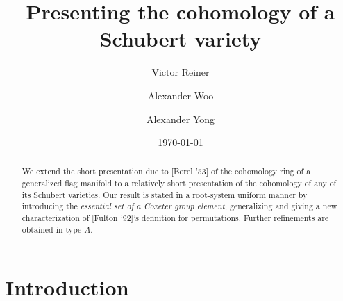 \documentclass[12pt,dvips]{amsart}
\theoremstyle{plain}
\theoremstyle{definition}
\theoremstyle{remark}
\numberwithin{equation}{section}
\begin{document}
\pagestyle{plain}
\title[Presenting Schubert variety cohomology]{Presenting the cohomology of a Schubert variety}

\author{Victor Reiner}
\address{School of Mathematics\\
University of  Minnesota\\
Minneapolis, MN 55455}

\author{Alexander Woo}
\address{Dept. of Mathematics, Statistics, and Computer Science\\
Saint Olaf College\\
Northfield, MN 55057 }

\author{Alexander Yong}
\address{Dept. of Mathematics\\
University of Illinois at Urbana-Champaign\\
Urbana, IL 61801}



\date{\today}

\begin{abstract}
We extend the short presentation due to [Borel '53] of the cohomology
ring of a generalized flag manifold to a relatively short presentation
of the cohomology of any of its Schubert varieties. Our result is
stated in a root-system uniform manner by introducing the {\it
essential set of a Coxeter group element}, generalizing and giving a
new characterization of [Fulton '92]'s definition for permutations.
Further refinements are obtained in type $A$.
\end{abstract}

\maketitle

\tableofcontents

\newpage 
\section{Introduction}
\label{intro-section}

\end{document}
